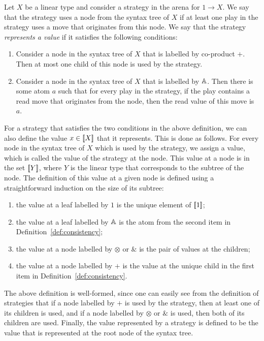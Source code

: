 \begin{definition}\label{def:consistency}
    Let $X$ be a linear type and consider a  strategy in  the arena for $1 \to X$. We say that the strategy uses a node from the syntax tree of $X$ if at least one play in the strategy uses a move that originates from this node. We say that the  strategy    \emph{represents a value} if it satisfies the following conditions: 
    \begin{enumerate}
        \item Consider a node in  the syntax tree of $X$ that is labelled by co-product $+$. Then at most one child of this node is  used by the strategy. 
        \item Consider a node  in the syntax tree of $X$ that  is labelled by $\mathbb A$. Then there is some atom $a$ such that for every play in the strategy, if the play contains a read move that originates from the node, then the read value of this move is $a$. 
    \end{enumerate}
\end{definition}

For a strategy that satisfies the two conditions in the above definition, we can also define the value $x \in [{\kern-0.45ex}[X]{\kern-0.45ex}]$ that it represents.  This is done as follows.  For every node  in the syntax tree  of $X$ which is used by the strategy, we assign a value, which is called the value of the strategy at the node. This value at a node is in the set $[{\kern-0.45ex}[Y]{\kern-0.45ex}]$, where $Y$ is the linear type that corresponds to the subtree of the node.  The definition of this value at a given node  is defined using a straightforward induction on the size of its subtree: 
\begin{enumerate}
    \item the value at a leaf labelled by $1$ is the unique element of $[{\kern-0.45ex}[1]{\kern-0.45ex}]$;
    \item the value at a leaf labelled by $\mathbb A$ is the atom from the second item in Definition~\ref{def:consistency};
    \item the value at a node labelled by $\otimes$ or $\&$ is the pair of values at the children;
    \item the value at a node labelled by $+$ is the value at  the unique child in the first item in Definition~\ref{def:consistency}.
\end{enumerate}
The above definition is well-formed, since one can easily see from the definition of strategies that if a node labelled by $+$ is used by the strategy, then at least one of its children is used, and if a node labelled by $\otimes$ or $\&$ is used, then both of its children are used. Finally, the value represented by a strategy is defined to be the value that is represented at the root node of the syntax tree. 


